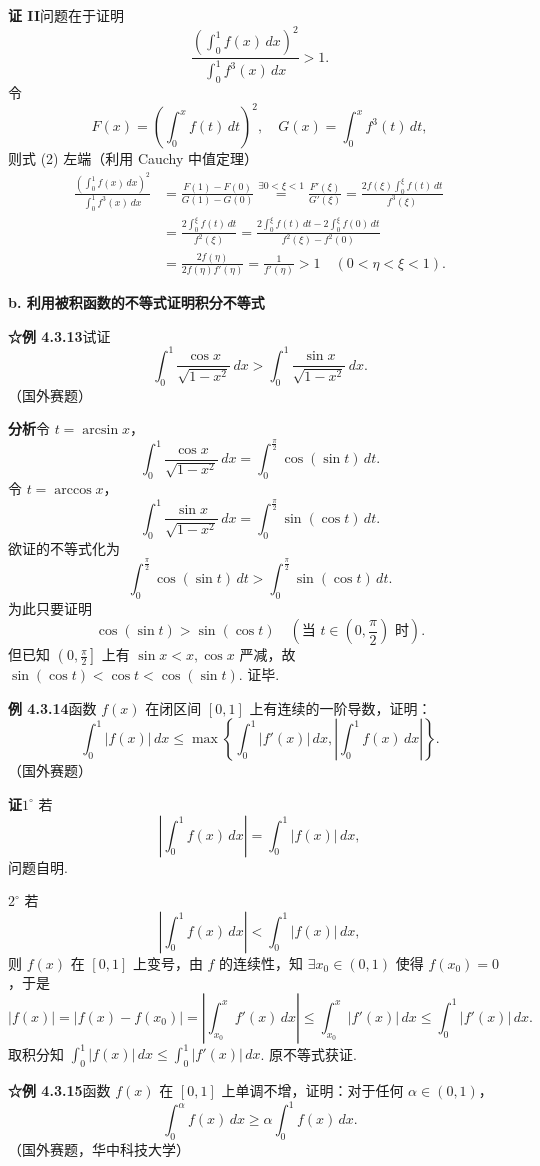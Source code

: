 \documentclass[UTF8,12pt,a4paper,fontset=fandol]{ctexart}
\begin{document}
\noindent\textbf{证 II}\quad 问题在于证明
\[
\frac{\left(\int_0^1 f(x)\,dx\right)^2}{\int_0^1 f^3(x)\,dx}>1.
\tag{2}
\]
令
\[
F(x)=\left(\int_0^x f(t)\,dt\right)^2,\quad
G(x)=\int_0^x f^3(t)\,dt,
\]
则式 (2) 左端（利用 Cauchy 中值定理）
\[
\begin{aligned}
\frac{\left(\int_0^1 f(x)\,dx\right)^2}{\int_0^1 f^3(x)\,dx}
&=\frac{F(1)-F(0)}{G(1)-G(0)}
\overset{\exists0<\xi<1}{=}
\frac{F'(\xi)}{G'(\xi)}
=\frac{2f(\xi)\int_0^\xi f(t)\,dt}{f^3(\xi)}\\
&=\frac{2\int_0^\xi f(t)\,dt}{f^2(\xi)}
=\frac{2\int_0^\xi f(t)\,dt-2\int_0^\xi f(0)\,dt}{f^2(\xi)-f^2(0)}\\
&=\frac{2f(\eta)}{2f(\eta)f'(\eta)}
=\frac1{f'(\eta)}>1\quad(0<\eta<\xi<1).
\end{aligned}
\]

\noindent\textbf{b. 利用被积函数的不等式证明积分不等式}

\noindent\textbf{☆例 4.3.13}\quad 试证
\[
\int_0^1\frac{\cos x}{\sqrt{1-x^2}}\,dx
>\int_0^1\frac{\sin x}{\sqrt{1-x^2}}\,dx.
\tag{1}
\]
（国外赛题）

\noindent\textbf{分析}\quad 令 $t=\arcsin x$，
\[
\int_0^1\frac{\cos x}{\sqrt{1-x^2}}\,dx
=\int_0^{\frac\pi2}\cos(\sin t)\,dt.
\]
令 $t=\arccos x$，
\[
\int_0^1\frac{\sin x}{\sqrt{1-x^2}}\,dx
=\int_0^{\frac\pi2}\sin(\cos t)\,dt.
\]
欲证的不等式化为
\[
\int_0^{\frac\pi2}\cos(\sin t)\,dt
>\int_0^{\frac\pi2}\sin(\cos t)\,dt.
\tag{2}
\]
为此只要证明
\[
\cos(\sin t)>\sin(\cos t)\quad\left(\text{当 }t\in\left(0,\frac\pi2\right)\text{ 时}\right).
\tag{3}
\]
但已知 $\left(0,\frac\pi2\right]$ 上有 $\sin x<x,\cos x$ 严减，故 $\sin(\cos t)<\cos t<\cos(\sin t)$. 证毕.

\noindent\textbf{例 4.3.14}\quad 函数 $f(x)$ 在闭区间 $[0,1]$ 上有连续的一阶导数，证明：
\[
\int_0^1|f(x)|\,dx
\le\max\left\{\int_0^1|f'(x)|\,dx,\left|\int_0^1 f(x)\,dx\right|\right\}.
\]
（国外赛题）

\noindent\textbf{证}\quad $1^\circ$ 若
\[
\left|\int_0^1 f(x)\,dx\right|=\int_0^1|f(x)|\,dx,
\]
问题自明.

\noindent $2^\circ$ 若
\[
\left|\int_0^1 f(x)\,dx\right|<\int_0^1|f(x)|\,dx,
\]
则 $f(x)$ 在 $[0,1]$ 上变号，由 $f$ 的连续性，知 $\exists x_0\in(0,1)$ 使得 $f(x_0)=0$，于是
\[
|f(x)|=|f(x)-f(x_0)|
=\left|\int_{x_0}^x f'(x)\,dx\right|
\le\int_{x_0}^x|f'(x)|\,dx
\le\int_0^1|f'(x)|\,dx.
\]
取积分知 $\int_0^1|f(x)|\,dx\le\int_0^1|f'(x)|\,dx$. 原不等式获证.

\noindent\textbf{☆例 4.3.15}\quad 函数 $f(x)$ 在 $[0,1]$ 上单调不增，证明：对于任何 $\alpha\in(0,1)$，
\[
\int_0^\alpha f(x)\,dx\ge\alpha\int_0^1 f(x)\,dx.
\tag{1}
\]
（国外赛题，华中科技大学）
\end{document}
